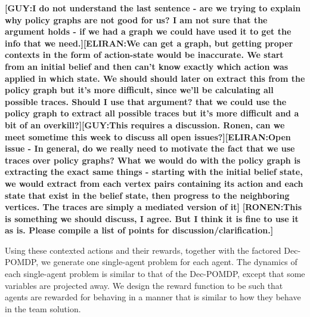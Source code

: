 \documentclass[letterpaper]{article} %
\newcommand{\eliran}[1]{\textbf{[\color{red}ELIRAN:#1]}}
\newcommand{\ronen}[1]{\textbf{[\color{blue}RONEN:#1]}}
\newcommand{\guy}[1]{\textbf{[\color{orange}GUY:#1]}}
\begin{document}
\guy{I do not understand the last sentence - are we trying to explain why policy graphs are not good for us? I am not sure that the argument holds - if we had a graph we could have used it to get the info that we need.}\eliran{We can get a graph, but getting proper contexts in the form of action-state would be inaccurate. We start from an initial belief and then can't know exactly which action was applied in which state. We should should later on extract this from the policy graph but it's more difficult, since we'll be calculating all possible traces. Should I use that argument? that we could use the policy graph to extract all possible traces but it's more difficult and a bit of an overkill?}\guy{This requires a discussion. Ronen, can we meet sometime this week to discuss all open issues?}\eliran{Open issue - In general, do we really need to motivate the fact that we use traces over policy graphs? What we would do with the policy graph is extracting the exact same things - starting with the initial belief state, we would extract from each vertex pairs containing its action and each state that exist in the belief state, then progress to the neighboring vertices. The traces are simply a mediated version of it}
\ronen{This is something we should discuss, I agree. But I think it is fine to use it as is.
Please compile a list of points for discussion/clarification.}

Using these contexted actions and their rewards, together with the factored Dec-POMDP, we  generate
one single-agent problem for each agent. The dynamics of each single-agent problem is similar to that of the Dec-POMDP, except that some variables are projected away. We design the reward function to be such that agents are rewarded for behaving in a manner that is similar to how they behave in the team solution.
\end{document}

